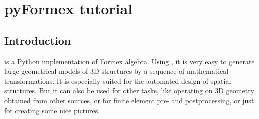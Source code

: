 
\chapter{pyFormex tutorial}
\label{cha:tutorial}


\section{Introduction}
\label{sec:intro-tut}

\pyformex is a Python implementation of Formex algebra. Using \pyformex, it is very easy to generate large geometrical models of 3D structures by a sequence of mathematical transformations. It is especially suited for the automated design of spatial structures. But it can also be used for other tasks, like operating on 3D geometry obtained from other sources, or for finite element pre- and postprocessing, or just for creating some nice pictures.

